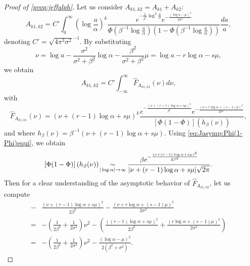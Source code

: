 \begin{proof}[Proof of \cref{prop:jeffalph}]
Let us consider $A_{k1,k2}=A_{k1}+A_{k2}$:
\begin{equation}
     A_{k1,k2} = C'\int_0^{\infty}\left(\log\frac{a}{\alpha}\right)^k\frac{e^{-\frac{1}{\beta^{2}}\log^2\frac{a}{\alpha}}e^{-\frac{(\log a-\mu)^2}{2\sigma^2}}}{\Phi(\beta^{-1}\log\frac{a}{\alpha})\left(1-\Phi(\beta^{-1}\log\frac{a}{\alpha})\right)}\frac{da}{a},
\end{equation}
denoting $C'=\sqrt{4\pi^3\sigma^2}^{-1}$. By substituting
\begin{equation}
    \nu = \log a - \frac{\sigma^2}{\sigma^2+ \beta^2}\log\alpha - \frac{\beta^2}{\sigma^2+\beta^2}\mu = \log a -r\log\alpha - s\mu,
\end{equation}
we obtain
\begin{equation}%
     A_{k1,k2} = C'\int_{-\infty}^\infty \hat F_{A_{k1,k1}}(\nu)d\nu , 
\end{equation}
with
\begin{equation}
    \hat F_{A_{k1,k1}}(\nu)=   (\nu+(r-1)\log\alpha +s\mu)^k\frac{e^{-\frac{(\nu + (r+1)\log\alpha +s\mu)^2 }{\beta^2} } e^{-\frac{(\nu +r\log\alpha+ (s-1)\mu)^2}{2\sigma^2}}}{\left[\Phi(1-\Phi)\right](h_\beta(\nu))} ,
\end{equation}
and where $h_\beta(\nu)=\beta^{-1}(\nu+(r-1)\log\alpha+s\mu)$. Using \cref{eq:Jasymp:Phi(1-Phi)equi}, we obtain
\begin{equation}\label{eq:Jasymp:phi1phinurs}
    \left[\Phi(1-\Phi)\right](h_\beta(\nu))\hspace*{-2pt} \underset{|\log\alpha|\rightarrow\infty}{\sim} \hspace*{-1pt}\frac{\beta e^{-\frac{(\nu+(r-1)\log\alpha+s\mu)^2}{2\beta^2}}}{|\nu + (r-1)\log\alpha + s\mu|\sqrt{2\pi}}.
\end{equation}
Then for a clear understanding of the asymptotic behavior of $\hat F_{A_{k1,k2}}$, let us compute 
\begin{equation}
    \begin{aligned}
     -&\frac{(\nu + (r-1)\log\alpha +s\mu)^2 }{2\beta^2} - \frac{(\nu +r\log\alpha+ (s-1)\mu)^2}{2\sigma^2} \\
=& -\left(\frac{1}{2\beta^2}+\frac{1}{2\sigma^2}\right)\nu^2 -\left(\frac{((r-1)\log\alpha+s\mu)^2}{2\beta^2} +\frac{(r\log\alpha+(s-1)\mu)^2}{2\sigma^2}\right)%
\\
         =& -\left(\frac{1}{2\beta^2}+\frac{1}{2\sigma^2}\right)\nu^2 - \frac{(\log\alpha - \mu )^2}{2(\beta^2+\sigma^2)}.
\label{eq:Jasymp:nurs}
    \end{aligned}

\end{equation}
\end{proof}
